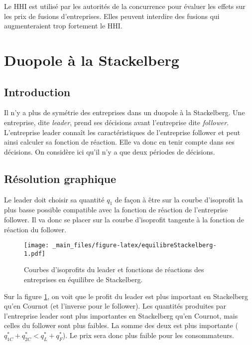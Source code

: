 \documentclass[
]{book}
\theoremstyle{definition}
\theoremstyle{definition}
\theoremstyle{definition}
\theoremstyle{definition}
\theoremstyle{remark}
\begin{document}
Le HHI est utilisé par les autorités de la concurrence pour évaluer les effets sur les prix de fusions d'entreprises.
Elles peuvent interdire des fusions qui augmenteraient trop fortement le HHI.

\hypertarget{duopole-uxe0-la-stackelberg}{%
\section{Duopole à la Stackelberg}\label{duopole-uxe0-la-stackelberg}}

\hypertarget{introduction-1}{%
\subsection{Introduction}\label{introduction-1}}

Il n'y a plus de symétrie des entreprises dans un duopole à la Stackelberg.
Une entreprise, dite \emph{leader}, prend ses décisions avant l'entreprise dite \emph{follower}.
L'entreprise leader connaît les caractéristiques de l'entreprise follower et peut ainsi calculer sa fonction de réaction.
Elle va donc en tenir compte dans ses décisions.
On considère ici qu'il n'y a que deux périodes de décisions.

\hypertarget{ruxe9solution-graphique}{%
\subsection{Résolution graphique}\label{ruxe9solution-graphique}}

Le leader doit choisir sa quantité \(q_1\) de façon à être sur la courbe d'isoprofit la plus basse possible compatible avec la fonction de réaction de l'entreprise follower.
Il va donc se placer sur la courbe d'isoprofit tangente à la fonction de réaction du follower.

\begin{figure}
\centering
\texttt{[image: \_main\_files/figure-latex/equilibreStackelberg-1.pdf]}
\caption{\label{fig:equilibreStackelberg}Courbes d'isoprofits du leader et fonctions de réactions des entreprises en équilibre de Stackelberg.}
\end{figure}

Sur la figure \ref{fig:equilibreStackelberg}, on voit que le profit du leader est plus important en Stackelberg qu'en Cournot (et l'inverse pour le follower).
Les quantités produites par l'entreprise leader sont plus importantes en Stackelberg qu'en Cournot, mais celles du follower sont plus faibles.
La somme des deux est plus importante (\(q_{1C}^*+q_{2C}^*<q_{L}^*+q_{F}^*\)).
Le prix sera donc plus faible pour les consommateurs.
\end{document}
